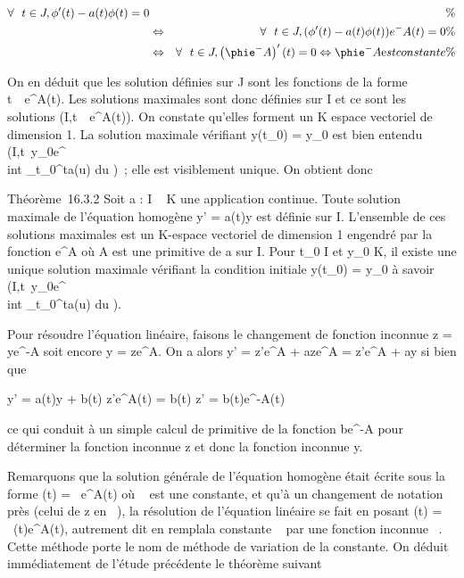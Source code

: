 \begin{align*} \forall~~t \in J,
\phi'(t) - a(t)\phi(t) = 0&& \%& \\ &
\Leftrightarrow & \forall~~t \in J, (\phi'(t)
- a(t)\phi(t))e^-A(t) = 0 \%& \\
& \Leftrightarrow & \forall~~t \in J,
\left (\phie^-A\right )'(t) = 0
\Leftrightarrow \phie^-A\text est
constante\%& \\
\end{align*}

On en déduit que les solution définies sur J sont les fonctions de la
forme t\mapsto~\lambda~e^A(t). Les solutions
maximales sont donc définies sur I et ce sont les solutions
(I,t\mapsto~\lambda~e^A(t)). On constate
qu'elles forment un K espace vectoriel de dimension 1. La solution
maximale vérifiant y(t_0) = y_0 est bien entendu
(I,t\mapsto~y_0e^\\int
 _t_0^ta(u) du )~; elle est visiblement
unique. On obtient donc

Théorème~16.3.2 Soit a : I \rightarrow~ K une application continue. Toute solution
maximale de l'équation homogène y' = a(t)y est définie sur I. L'ensemble
de ces solutions maximales est un K-espace vectoriel de dimension 1
engendré par la fonction e^A où A est une primitive de a sur
I. Pour t_0 \in I et y_0 \in K, il existe une unique
solution maximale vérifiant la condition initiale y(t_0) =
y_0 à savoir
(I,t\mapsto~y_0e^\\int
 _t_0^ta(u) du ).

Pour résoudre l'équation linéaire, faisons le changement de fonction
inconnue z = ye^-A soit encore y = ze^A. On a
alors y' = z'e^A + aze^A = z'e^A + ay
si bien que

y' = a(t)y + b(t) \Leftrightarrow z'e^A(t) =
b(t) \Leftrightarrow z' = b(t)e^-A(t)

ce qui conduit à un simple calcul de primitive de la fonction
be^-A pour déterminer la fonction inconnue z et donc la
fonction inconnue y.

Remarquons que la solution générale de l'équation homogène était écrite
sous la forme \phi(t) = \lambda~e^A(t) où \lambda~ est une constante, et qu'à
un changement de notation près (celui de z en \lambda~), la résolution de
l'équation linéaire se fait en posant \phi(t) = \lambda~(t)e^A(t),
autrement dit en rempla\ccant la constante \lambda~ par une
fonction inconnue \lambda~. Cette méthode porte le nom de méthode de variation
de la constante. On déduit immédiatement de l'étude précédente le
théorème suivant

